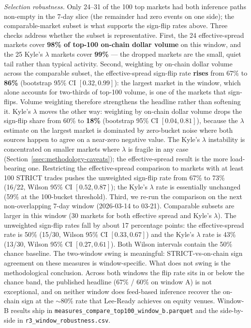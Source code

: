 \textit{Selection robustness.}
Only 24--31 of the 100 top markets had both inference paths non-empty
in the 7-day slice (the remainder had zero events on one side); the
comparable-market subset is what supports the sign-flip rates above.
Three checks address whether the subset is representative.
First, the 24 effective-spread markets cover \textbf{98\% of top-100
on-chain dollar volume} on this window, and the 25 Kyle's $\lambda$
markets cover \textbf{99\%} — the dropped markets are the small,
quiet tail rather than typical activity. Second, weighting by
on-chain dollar volume across the comparable subset, the
effective-spread sign-flip rate \textbf{rises} from 67\% to
\textbf{86\%} (bootstrap 95\% CI $[0.32, 0.99]$): the largest market
in the window, which alone accounts for two-thirds of top-100 volume,
is one of the markets that sign-flips. Volume weighting therefore
strengthens the headline rather than softening it. Kyle's $\lambda$
moves the other way: weighting by on-chain dollar volume drops the
sign-flip share from 60\% to \textbf{18\%} (bootstrap 95\% CI
$[0.04, 0.81]$), because the $\lambda$ estimate on the largest market
is dominated by zero-bucket noise where both sources happen to agree
on a near-zero negative value. The Kyle's $\lambda$ instability is
concentrated on smaller markets where $\lambda$ is fragile in any
case (Section~\ref{ssec:methodology-caveats}); the effective-spread
result is the more load-bearing one. Restricting the
effective-spread comparison to markets with at least 100 STRICT
trades pushes the unweighted sign-flip rate from 67\% to 73\% (16/22,
Wilson 95\% CI $[0.52, 0.87]$); the Kyle's $\lambda$ rate is
essentially unchanged (59\% at the 100-bucket threshold). Third, we
re-run the comparison on the next non-overlapping 7-day window
(2026-03-14 to 03-21). Comparable subsets are larger in this window
(30 markets for both effective spread and Kyle's $\lambda$). The
unweighted sign-flip rates fall by about 17 percentage points: the
effective-spread rate is 50\% (15/30, Wilson 95\% CI $[0.33, 0.67]$)
and the Kyle's $\lambda$ rate is 43\% (13/30, Wilson 95\% CI
$[0.27, 0.61]$). Both Wilson intervals contain the 50\% chance
baseline. The two-window swing is meaningful: STRICT-vs-on-chain
sign agreement on these measures is window-specific. What does not
swing is the methodological conclusion. Across both windows the
flip rate sits in or below the chance band, the published headline
(67\% / 60\% on window A) is not exceptional, and on neither window
does feed-based inference recover the on-chain sign at the
$\sim 80\%$ rate that Lee-Ready achieves on equity venues. Window-B
results ship in
\texttt{measures\_\allowbreak compare\_\allowbreak top100\_\allowbreak window\_b.parquet}
and the side-by-side
in \texttt{r3\_\allowbreak window\_\allowbreak robustness.csv}.

